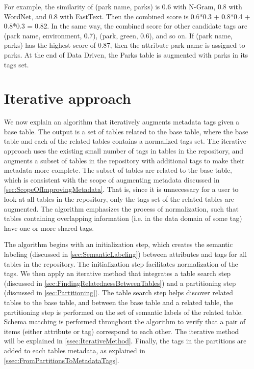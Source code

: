 For example, the similarity of (park name, parks) is 0.6 with N-Gram, 0.8 with WordNet, and 0.8 with FastText. Then the combined score is 0.6*0.3 + 0.8*0.4 + 0.8*0.3 = 0.82. In the same way, the combined score for other candidate tags are (park name, environment, 0.7), (park, green, 0.6), and so on. If (park name, parks) has the highest score of 0.87, then the attribute park name is assigned to parks. At the end of Data Driven, the Parks table is augmented with parks in its tags set.

\section{Iterative approach}
\label{sec:IterativeApproach}

We now explain an algorithm that iteratively augments metadata tags given a base table. The output is a set of tables related to the base table, where the base table and each of the related tables contains a normalized tags set. The iterative approach uses the existing small number of tags in tables in the repository, and augments a subset of tables in the repository with additional tags to make their metadata more complete. The subset of tables are related to the base table, which is consistent with the scope of augmenting metadata discussed in \autoref{sec:ScopeOfImprovingMetadata}. That is, since it is unnecessary for a user to look at all tables in the repository, only the tags set of the related tables are augmented. The algorithm emphasizes the process of normalization, such that tables containing overlapping information (i.e. in the data domain of some tag) have one or more shared tags.

The algorithm begins with an initialization step, which creates the semantic labeling (discussed in \autoref{sec:SemanticLabeling}) between attributes and tags for all tables in the repository. The initialization step facilitates normalization of the tags. We then apply an iterative method that integrates a table search step (discussed in \autoref{sec:FindingRelatednessBetweenTables}) and a partitioning step (discussed in \autoref{sec:Partitioning}). The table search step helps discover related tables to the base table, and between the base table and a related table, the partitioning step is performed on the set of semantic labels of the related table. Schema matching is performed throughout the algorithm to verify that a pair of items (either attribute or tag) correspond to each other. The iterative method will be explained in \autoref{ssec:IterativeMethod}. Finally, the tags in the partitions are added to each tables metadata, as explained in \autoref{ssec:FromPartitionsToMetadataTags}.

